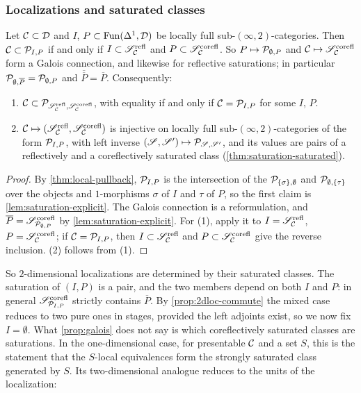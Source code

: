 \subsubsection*{Localizations and saturated classes}

\begin{prop}
\label{prop:galois}
%
Let $\mathcal{C} \subset \mathcal{D}$ and $I$,
$P \subset \operatorname{Fun}(\Delta^{1},\mathcal{D})$
be locally full sub-$(\infty,2)$-categories.
Then $\mathcal{C} \subset \mathcal{P}_{I,P}$ if and only if
$I \subset \mathscr{S}^{\mathrm{refl}}_{\mathcal{C}}$
and
$P \subset \mathscr{S}^{\mathrm{corefl}}_{\mathcal{C}}$.
So
$P \mapsto \mathcal{P}_{\emptyset,P}$
and
$\mathcal{C} \mapsto \mathscr{S}^{\mathrm{corefl}}_{\mathcal{C}}$
form a Galois connection, and likewise for reflective saturations; in particular
$\mathcal{P}_{\emptyset,\overline{P}} = \mathcal{P}_{\emptyset,P}$
and
$\overline{\overline{P}} = \overline{P}$.
Consequently:
\begin{enumerate}
\item
$\mathcal{C} \subset \mathcal{P}_{\mathscr{S}^{\mathrm{refl}}_{\mathcal{C}},\mathscr{S}^{\mathrm{corefl}}_{\mathcal{C}}}$,
with equality if and only if $\mathcal{C} = \mathcal{P}_{I,P}$ for some $I$, $P$.
\item
$\mathcal{C} \mapsto (\mathscr{S}^{\mathrm{refl}}_{\mathcal{C}},\mathscr{S}^{\mathrm{corefl}}_{\mathcal{C}})$
is injective on locally full sub-$(\infty,2)$-categories of the form
$\mathcal{P}_{I,P}$, with left inverse
$(\mathscr{S},\mathscr{S}') \mapsto \mathcal{P}_{\mathscr{S},\mathscr{S}'}$,
and its values are pairs of a reflectively and a coreflectively saturated class
(\cref{thm:saturation-saturated}).
\end{enumerate}
\end{prop}

\begin{proof}
%
By \cref{thm:local-pullback}, $\mathcal{P}_{I,P}$ is the intersection of the
$\mathcal{P}_{\{\sigma\},\emptyset}$
and
$\mathcal{P}_{\emptyset,\{\tau\}}$
over the objects and $1$-morphisms $\sigma$ of $I$ and $\tau$ of $P$,
so the first claim is \cref{lem:saturation-explicit}.
The Galois connection is a reformulation, and
$\overline{P} = \mathscr{S}^{\mathrm{corefl}}_{\mathcal{P}_{\emptyset,P}}$
by \cref{lem:saturation-explicit}. For (1), apply it to
$I = \mathscr{S}^{\mathrm{refl}}_{\mathcal{C}}$,
$P = \mathscr{S}^{\mathrm{corefl}}_{\mathcal{C}}$;
if $\mathcal{C} = \mathcal{P}_{I,P}$, then
$I \subset \mathscr{S}^{\mathrm{refl}}_{\mathcal{C}}$
and
$P \subset \mathscr{S}^{\mathrm{corefl}}_{\mathcal{C}}$
give the reverse inclusion. (2) follows from (1).
\end{proof}

%
So $2$-dimensional localizations are determined by their saturated classes.
The saturation of $(I,P)$ is a pair, and the two members depend on both $I$ and
$P$: in general
$\mathscr{S}^{\mathrm{corefl}}_{\mathcal{P}_{I,P}}$
strictly contains $\overline{P}$. By \cref{prop:2dloc-commute} the mixed case
reduces to two pure ones in stages, provided the left adjoints exist,
so we now fix $I = \emptyset$.
What \cref{prop:galois} does not say is which coreflectively saturated classes
are saturations. In the one-dimensional case,
for presentable $\mathcal{C}$ and a set $S$, this is the statement that the $S$-local
equivalences form the strongly saturated class generated by $S$.
Its two-dimensional analogue reduces to the units of the localization:

